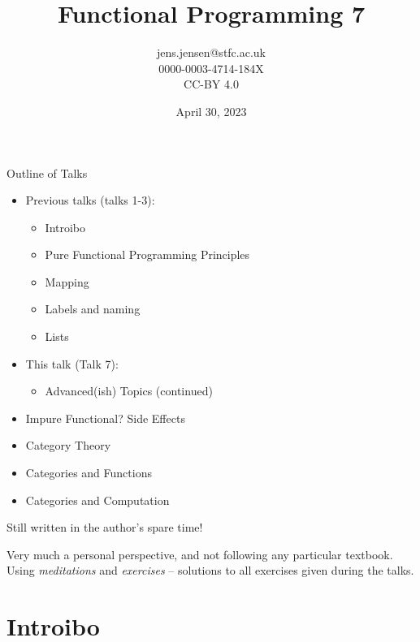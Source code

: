 \documentclass[presentation]{beamer}
\author{jens.jensen@stfc.ac.uk \\0000-0003-4714-184X\\CC-BY 4.0}
\date{April 30, 2023}
\title{Functional Programming 7}
\begin{document}
\maketitle
\begin{frame}{Outline of Talks}

  \begin{itemize}
    \item Previous talks (talks 1-3):
    \begin{itemize}
\item Introibo
\item Pure Functional Programming Principles
    \item Mapping
    \item Labels and naming
    \item Lists
    \end{itemize}
  \item This talk (Talk 7):
    \begin{itemize}
    \item Advanced(ish) Topics (continued)
    \end{itemize}
\item Impure Functional? Side Effects
\item Category Theory
\item Categories and Functions
\item Categories and Computation

  \end{itemize}
Still written in the author's spare time!

\medskip

Very much a personal perspective, and not following any particular textbook.  Using \emph{meditations} and \emph{exercises} -- solutions to all exercises given during the talks.

\end{frame}


\section{Introibo}
\label{sec:org0edb596}
\end{document}
